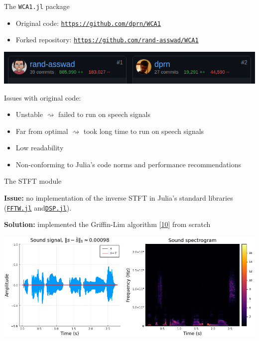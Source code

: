 \documentclass[10pt,american,ignorenonframetext,aspectratio=1610]{beamer}
\providecommand{\tightlist}{%
  \setlength{\itemsep}{0pt}\setlength{\parskip}{0pt}}
\theoremstyle{remark}
\begin{document}
\begin{frame}[fragile]{The \texttt{WCA1.jl} package}
\protect\hypertarget{the-wca1.jl-package-1}{}

\begin{itemize}
\tightlist
\item
  Original code:
  \href{https://github.com/dprn/WCA1}{\texttt{https://github.com/dprn/WCA1}}
\item
  Forked repository:
  \href{https://github.com/rand-asswad/WCA1}{\texttt{https://github.com/rand-asswad/WCA1}}
\end{itemize}

\includegraphics{img/github_contributions.png}

Issues with original code:

\begin{itemize}
\tightlist
\item
  Unstable \(\rightsquigarrow\) failed to run on speech signals
\item
  Far from optimal \(\rightsquigarrow\) took long time to run on speech
  signals
\item
  Low readability
\item
  Non-conforming to Julia's code norms and performance recommendations
\end{itemize}

\end{frame}

\begin{frame}[fragile]{The STFT module}
\protect\hypertarget{the-stft-module}{}

\textbf{Issue:} no implementation of the inverse STFT in Julia's
standard libraries
(\href{https://juliapackages.com/p/fftw}{\texttt{FFTW.jl}}
and\href{https://juliapackages.com/p/dsp}{\texttt{DSP.jl}}).

\textbf{Solution:} implemented the Griffin-Lim algorithm
{[}\protect\hyperlink{ref-griffin1983}{10}{]} from scratch

\includegraphics{img/stft_istft.png}

\end{frame}
\end{document}
